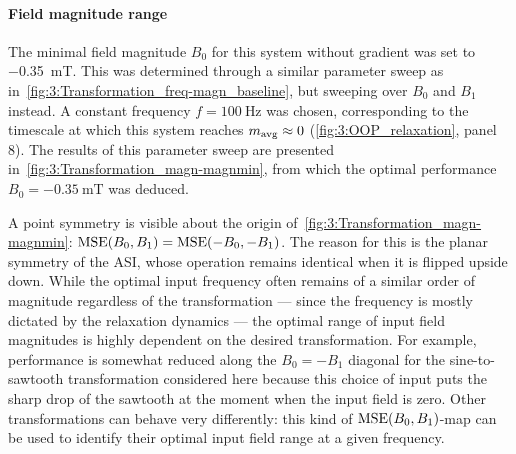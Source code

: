 \paragraph{Field magnitude range}
The minimal field magnitude $B_0$ for this system without gradient was set to \SI{-0.35}{\milli\tesla}.
This was determined through a similar parameter sweep as in~\cref{fig:3:Transformation_freq-magn_baseline}, but sweeping over $B_0$ and $B_1$ instead.
A constant frequency $f=\SI{100}{\hertz}$ was chosen, corresponding to the timescale at which this system reaches $m_\mathrm{avg} \approx 0$ (\cref{fig:3:OOP_relaxation}, panel 8).
The results of this parameter sweep are presented in~\cref{fig:3:Transformation_magn-magnmin}, from which the optimal performance $B_0=\SI{-0.35}{\milli\tesla}$ was deduced.

\vspace{-1em}

A point symmetry is visible about the origin of~\cref{fig:3:Transformation_magn-magnmin}: $\mathrm{MSE}(B_0, B_1) = \mathrm{MSE}(-B_0, -B_1)$.
The reason for this is the planar symmetry of the ASI, whose operation remains identical when it is flipped upside down.
While the optimal input frequency often remains of a similar order of magnitude regardless of the transformation --- since the frequency is mostly dictated by the relaxation dynamics --- the optimal range of input field magnitudes is highly dependent on the desired transformation.
For example, performance is somewhat reduced along the $B_0 = -B_1$ diagonal for the sine-to-sawtooth transformation considered here because this choice of input puts the sharp drop of the sawtooth at the moment when the input field is zero.
Other transformations can behave very differently: this kind of $\mathrm{MSE}(B_0, B_1)$-map can be used to identify their optimal input field range at a given frequency.

